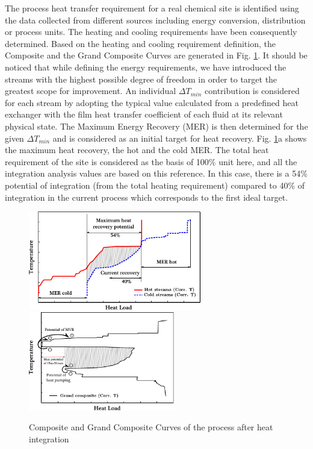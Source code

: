 The process heat transfer requirement for a real chemical site is identified using the data collected from different sources including energy conversion, distribution or process units. The heating and cooling requirements have been consequently determined. Based on the heating and cooling requirement definition, the Composite and the Grand Composite Curves are generated in Fig. \ref{fig1:mer}. It should be noticed that while defining the energy requirements, we have introduced the streams with the highest possible degree of freedom in order to target the greatest scope for improvement. An individual $\Delta T_{min}$ contribution is considered for each stream by adopting the typical value calculated from a predefined heat exchanger with the film heat transfer coefficient of each fluid at its relevant physical state. The Maximum Energy Recovery (MER) is then determined for the given $\Delta T_{min}$ and is considered as an initial target for heat recovery. Fig. \ref{fig1:mer}a shows the maximum heat recovery, the hot and the cold MER. The total heat requirement of the site is considered as the basis of 100\% unit here, and all the integration analysis values are based on this reference. In this case, there is a 54\% potential of integration (from the total heating requirement) compared to 40\% of integration in the current process which corresponds to the first ideal target.


        \begin{figure}[h]
        \begin{center}
        \includegraphics [height=4.3cm]{figures/HeatIntegration/figMERcc.pdf} 
        \includegraphics [height=4.3cm]{figures/HeatIntegration/figMERgcc.pdf}
        \caption{Composite and Grand Composite Curves of the process after heat integration}
       \label{fig1:mer}
        \end{center}
        \end{figure}
 
